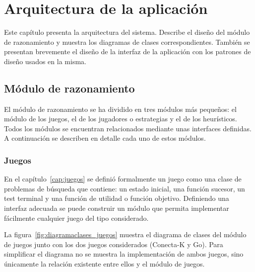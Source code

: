 \chapter{Arquitectura de la aplicación}
\label{cap:diseno}
Este capítulo presenta la arquitectura del sistema.
Describe el diseño del módulo de razonamiento y muestra los diagramas de clases correspondientes.
También se presentan brevemente el diseño de la interfaz de la aplicación con los patrones de diseño usados en la misma.

%
%
%


\section{Módulo de razonamiento}
\label{sec:arquitectura_modulo_razonamiento}
El módulo de razonamiento se ha dividido en tres módulos más pequeños: el módulo de los juegos, el de los jugadores o estrategias y el de los heurísticos.
Todos los módulos se encuentran relacionados mediante unas interfaces definidas.
A continuación se describen en detalle cada uno de estos módulos.

\subsection{Juegos}
\label{ssec:arquitectura_juegos}
En el capítulo~\ref{cap:juegos} se definió formalmente un juego como una clase de problemas de búsqueda que contiene: un estado inicial, una función sucesor, un test terminal y una función de utilidad o función objetivo.
Definiendo una interfaz adecuada se puede construir un módulo que permita implementar fácilmente cualquier juego del tipo considerado.

La figura~\ref{fig:diagramaclases_juegos} muestra el diagrama de clases del módulo de juegos junto con los dos juegos considerados (Conecta-K y Go).
Para simplificar el diagrama no se muestra la implementación de ambos juegos, sino únicamente la relación existente entre ellos y el módulo de juegos.

